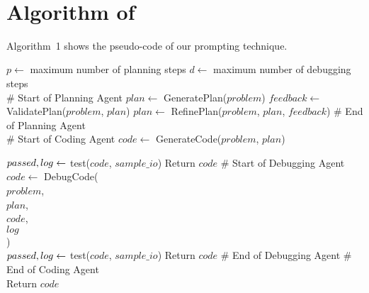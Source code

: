 \newpage

\vspace*{\textheight}
\newpage

 \\

\section{Algorithm of \ourapproach}
\label{alg:codesim}

Algorithm~1 shows the pseudo-code of our prompting technique.

\begin{algorithm}[h]
\small
\caption{\tool}
\begin{algorithmic}[1]

\State $p \gets$ maximum number of planning steps
\State $d \gets$ maximum number of debugging steps \\

    \State \# Start of Planning Agent
    \State $plan \gets$ GeneratePlan($problem$)
    \State $feedback \gets$ ValidatePlan($problem$, $plan$)
        \State $plan \gets$ RefinePlan($problem$, $plan$, $feedback$)
    \EndIf
    \State \# End of Planning Agent
    \\
    \State \# Start of Coding Agent
    \State $code \gets$ GenerateCode($problem$, $plan$) %
    
    \State $passed,\space log \gets$ test($code$, $sample\_io$) %
        \State Return $code$
    \Else
        \State \# Start of Debugging Agent
            \State $code \gets$ DebugCode(\\
                \quad \quad \quad \quad \quad $problem$,\\
                \quad \quad \quad \quad \quad $plan$, \\
                \quad \quad \quad \quad \quad $code$, \\
                \quad \quad \quad \quad \quad $log$ \\
            \quad \quad \quad \quad) \\ %
            \State $passed,\space log \gets$ test($code$, $sample\_io$)
                \State Return $code$
            \EndIf
        \EndFor
        \State \# End of Debugging Agent
    \EndIf
    \State \# End of Coding Agent
    \\
\EndFor
\State Return $code$
\end{algorithmic}
\end{algorithm}


